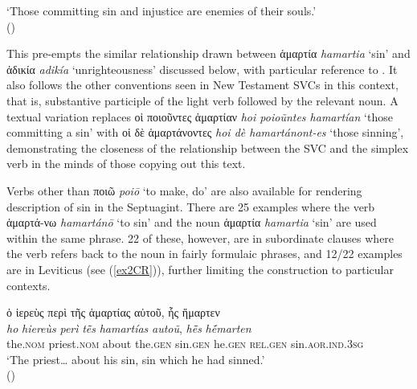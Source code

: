 \documentclass[output=paper,colorlinks,citecolor=brown]{langscibook}
\begin{document}
\glt `Those committing sin and injustice are enemies of their souls.' \\
\hspace*{\fill}()
\z



This pre-empts the similar relationship drawn between ἁμαρτία \textit{hamartia} ‘sin' and ἀδικία \textit{adikía} ‘unrighteousness'
discussed below, with particular reference to . 
It also follows
the other conventions seen in New Testament SVCs in this context, that
is, substantive participle of the light verb followed by the relevant
noun. 
A textual variation replaces οἱ ποιοῦντες ἁμαρτίαν \textit{hoi poioũntes hamartían} ‘those
committing a sin' with οἱ δὲ ἁμαρτάνοντες \textit{hoi dè hamartánont-es} ‘those sinning',
demonstrating the closeness of the relationship between the SVC and the
simplex verb in the minds of those copying out this text. %

Verbs other than ποιῶ \textit{poiō} ‘to make, do' are also available for rendering description of
sin in the Septuagint. There are 25 examples where the verb ἁμαρτά-νω \textit{hamartánō} ‘to sin' and %
the noun ἁμαρτία \textit{hamartia} ‘sin' are used within the same phrase.
22 of these, however,
are in subordinate clauses where the verb refers back to the noun in
fairly formulaic phrases, and 12/22 examples are in Leviticus (see (\ref{ex2CR})), further
limiting the construction to particular contexts.

\ea\label{ex2CR}  
\glll ὁ ἱερεὺς περὶ τῆς ἁμαρτίας αὐτοῦ, ἧς ἥμαρτεν\\
\textit{ho} \textit{hiereùs} \textit{perì} \textit{tē̃s} \textit{hamartías} \textit{autoũ}, \textit{hē̃s} \textit{hḗmarten}\\
    the.\textsc{nom} priest.\textsc{nom} about the.\textsc{gen} sin.\textsc{gen} he.\textsc{gen} \textsc{rel}.\textsc{gen} sin.\textsc{aor.ind.3sg} \\

\glt `The priest\ldots{} about his sin, sin which he had sinned.' \\
\hspace*{\fill}()
\z
\end{document}
